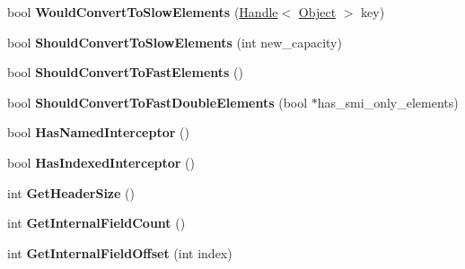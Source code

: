 \begin{DoxyCompactItemize}
\item 
\hypertarget{classv8_1_1internal_1_1_j_s_object_aca347a395f0161d3b749175e01b1dd37}{}bool {\bfseries Would\+Convert\+To\+Slow\+Elements} (\hyperlink{classv8_1_1internal_1_1_handle}{Handle}$<$ \hyperlink{classv8_1_1internal_1_1_object}{Object} $>$ key)\label{classv8_1_1internal_1_1_j_s_object_aca347a395f0161d3b749175e01b1dd37}

\item 
\hypertarget{classv8_1_1internal_1_1_j_s_object_aeeab9d2d854e6fa66a9290f8118a18d9}{}bool {\bfseries Should\+Convert\+To\+Slow\+Elements} (int new\+\_\+capacity)\label{classv8_1_1internal_1_1_j_s_object_aeeab9d2d854e6fa66a9290f8118a18d9}

\item 
\hypertarget{classv8_1_1internal_1_1_j_s_object_afcf170ee20c58bf9126c94be63761270}{}bool {\bfseries Should\+Convert\+To\+Fast\+Elements} ()\label{classv8_1_1internal_1_1_j_s_object_afcf170ee20c58bf9126c94be63761270}

\item 
\hypertarget{classv8_1_1internal_1_1_j_s_object_aec1ae3be406bbc920e0aa4b5f4bf0c6b}{}bool {\bfseries Should\+Convert\+To\+Fast\+Double\+Elements} (bool $\ast$has\+\_\+smi\+\_\+only\+\_\+elements)\label{classv8_1_1internal_1_1_j_s_object_aec1ae3be406bbc920e0aa4b5f4bf0c6b}

\item 
\hypertarget{classv8_1_1internal_1_1_j_s_object_a773cbcd6e76cc1969180ef399139b483}{}bool {\bfseries Has\+Named\+Interceptor} ()\label{classv8_1_1internal_1_1_j_s_object_a773cbcd6e76cc1969180ef399139b483}

\item 
\hypertarget{classv8_1_1internal_1_1_j_s_object_a21b64937063c2e27ea362cb38cf50980}{}bool {\bfseries Has\+Indexed\+Interceptor} ()\label{classv8_1_1internal_1_1_j_s_object_a21b64937063c2e27ea362cb38cf50980}

\item 
\hypertarget{classv8_1_1internal_1_1_j_s_object_ab5c9687d52aada4fafd5ccb38f9f3770}{}int {\bfseries Get\+Header\+Size} ()\label{classv8_1_1internal_1_1_j_s_object_ab5c9687d52aada4fafd5ccb38f9f3770}

\item 
\hypertarget{classv8_1_1internal_1_1_j_s_object_a95f7f29627e97c31b63a1942ad6c6a18}{}int {\bfseries Get\+Internal\+Field\+Count} ()\label{classv8_1_1internal_1_1_j_s_object_a95f7f29627e97c31b63a1942ad6c6a18}

\item 
\hypertarget{classv8_1_1internal_1_1_j_s_object_acfeeb19a5a6d83442b186ae22977dc44}{}int {\bfseries Get\+Internal\+Field\+Offset} (int index)\label{classv8_1_1internal_1_1_j_s_object_acfeeb19a5a6d83442b186ae22977dc44}


\end{DoxyCompactItemize}
